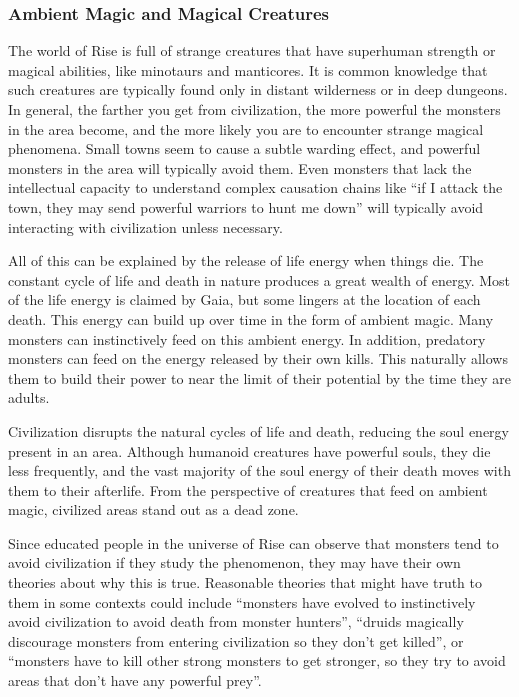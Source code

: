     \subsubsection{Ambient Magic and Magical Creatures}
      The world of Rise is full of strange creatures that have superhuman strength or magical abilities, like minotaurs and manticores.
      It is common knowledge that such creatures are typically found only in distant wilderness or in deep dungeons.
      In general, the farther you get from civilization, the more powerful the monsters in the area become, and the more likely you are to encounter strange magical phenomena.
      Small towns seem to cause a subtle warding effect, and powerful monsters in the area will typically avoid them.
      Even monsters that lack the intellectual capacity to understand complex causation chains like ``if I attack the town, they may send powerful warriors to hunt me down'' will typically avoid interacting with civilization unless necessary.

      All of this can be explained by the release of life energy when things die.
      The constant cycle of life and death in nature produces a great wealth of energy.
      Most of the life energy is claimed by Gaia, but some lingers at the location of each death.
      This energy can build up over time in the form of ambient magic.
      Many monsters can instinctively feed on this ambient energy.
      In addition, predatory monsters can feed on the energy released by their own kills.
      This naturally allows them to build their power to near the limit of their potential by the time they are adults.

      Civilization disrupts the natural cycles of life and death, reducing the soul energy present in an area.
      Although humanoid creatures have powerful souls, they die less frequently, and the vast majority of the soul energy of their death moves with them to their afterlife.
      From the perspective of creatures that feed on ambient magic, civilized areas stand out as a dead zone.

      Since educated people in the universe of Rise can observe that monsters tend to avoid civilization if they study the phenomenon, they may have their own theories about why this is true.
      Reasonable theories that might have truth to them in some contexts could include ``monsters have evolved to instinctively avoid civilization to avoid death from monster hunters'', ``druids magically discourage monsters from entering civilization so they don't get killed'', or ``monsters have to kill other strong monsters to get stronger, so they try to avoid areas that don't have any powerful prey''.
